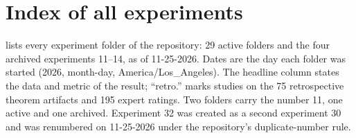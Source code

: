 \section{Index of all experiments}
\label{app:index}

 lists every experiment folder of the repository: 29 active folders and the four archived experiments 11--14, as of 11-25-2026.
Dates are the day each folder was started (2026, month-day, America/Los\_Angeles).
The headline column states the data and metric of the result; ``retro.'' marks studies on the 75 retrospective theorem artifacts and 195 expert ratings.
Two folders carry the number 11, one active and one archived. Experiment 32 was created as a second experiment 30 and was renumbered on 11-25-2026 under the repository's duplicate-number rule.

